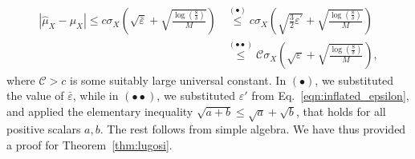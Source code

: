 \documentclass{article}
\newcommand{\mc}{\mathcal}
\begin{document}
\begin{equation}
\begin{aligned}
    \left| \hat{\mu}_X - \mu_X \right| \le c \sigma_X \left( \sqrt{\bar{\varepsilon}} + \sqrt{ \frac{\log\left( \frac{8}{\delta} \right)}{M} } \right) &\overset{(\bullet)}{\le} c \sigma_X \left( \sqrt{\frac{3}{2}\varepsilon^\prime} + \sqrt{ \frac{\log\left( \frac{8}{\delta} \right)}{M} } \right)\\
   &\overset{(\bullet \bullet)}{\le} \mc{C} \sigma_X \left( \sqrt{\varepsilon} + \sqrt{ \frac{\log\left( \frac{8}{\delta} \right)}{M} }\right),
\end{aligned}
\end{equation}
where $\mc{C} > c$ is some suitably large universal constant. In \((\bullet)\), we substituted the value of \(\bar{\varepsilon}\), while in \((\bullet\bullet)\), we substituted \(\varepsilon'\) from Eq.~\eqref{eqn:inflated_epsilon}, and applied the elementary inequality \(\sqrt{a + b} \le \sqrt{a} + \sqrt{b}\), that holds for all positive scalars $a,b$. The rest follows from simple algebra. We have thus provided a proof for Theorem~\ref{thm:lugosi}. 


\newpage
\end{document}
